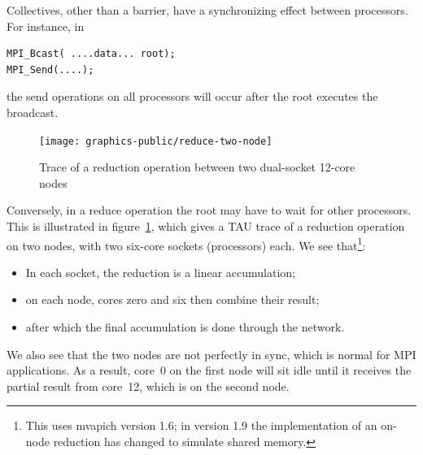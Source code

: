Collectives, other than a barrier, have a synchronizing effect between processors.
For instance, in
\begin{verbatim}
MPI_Bcast( ....data... root);
MPI_Send(....);
\end{verbatim}
the send operations on all processors will occur after the root executes
the broadcast. 
\begin{figure}[ht]
  \texttt{[image: graphics-public/reduce-two-node]}
  \caption{Trace of a reduction operation between two dual-socket 12-core nodes}
  \label{fig:trace-reduce}
\end{figure}
Conversely, in a reduce operation the root may have to wait for 
other processors. This is illustrated in figure~\ref{fig:trace-reduce}, which 
gives a TAU trace of
a reduction operation on two nodes, with two six-core sockets (processors) each.
We see that\footnote
{This uses mvapich version 1.6; in version 1.9 the implementation of an on-node reduction
has changed to simulate shared memory.}:
\begin{itemize}
\item In each socket, the reduction is a linear accumulation;
\item on each node, cores zero and six then combine their result;
\item after which the final accumulation is done through the network.
\end{itemize}
We also see that the two nodes are not perfectly in sync, which is normal for MPI
applications. As a result, core~0 on the first node will sit idle until it receives the partial
result from core~12, which is on the second node.

